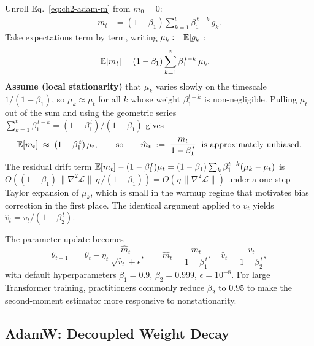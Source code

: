 \begin{derivation}
Unroll Eq.~\eqref{eq:ch2-adam-m} from $m_0 = 0$:
\begin{align*}
m_t &= (1-\beta_1) \sum_{k=1}^{t} \beta_1^{\,t-k}\, g_k.
\end{align*}
Take expectations term by term, writing $\mu_k := \mathbb{E}[g_k]$:
\begin{align*}
\mathbb{E}[m_t]
  &= (1-\beta_1) \sum_{k=1}^{t} \beta_1^{\,t-k}\,\mu_k.
\end{align*}
\textbf{Assume (local stationarity)} that $\mu_k$ varies slowly on the
timescale $1/(1-\beta_1)$, so $\mu_k \approx \mu_t$ for all $k$ whose
weight $\beta_1^{t-k}$ is non-negligible. Pulling $\mu_t$ out of the
sum and using the geometric series
$\sum_{k=1}^{t}\beta_1^{\,t-k} = (1-\beta_1^{\,t})/(1-\beta_1)$ gives
\begin{align*}
\mathbb{E}[m_t] \;\approx\; (1-\beta_1^{\,t})\,\mu_t,
\qquad
\text{so}\qquad
\hat m_t \;:=\; \frac{m_t}{1-\beta_1^{\,t}} \;\text{ is approximately unbiased}.
\end{align*}
The residual drift term $\mathbb{E}[m_t] - (1-\beta_1^{\,t})\mu_t
= (1-\beta_1)\sum_k \beta_1^{t-k}(\mu_k - \mu_t)$ is
$O\!\left((1-\beta_1)\,\|\nabla^{2}\!\mathcal{L}\|\,\eta\,/(1-\beta_1)\right)
= O(\eta\,\|\nabla^{2}\!\mathcal{L}\|)$ under a one-step Taylor
expansion of $\mu_k$, which is small in the warmup regime that motivates
bias correction in the first place. The identical argument applied to
$v_t$ yields $\hat v_t = v_t/(1-\beta_2^{\,t})$.
\end{derivation}

The parameter update becomes
\begin{equation}
\label{eq:ch2-adam-update}
\theta_{t+1} \;=\; \theta_t - \eta_t\,\frac{\hat m_t}{\sqrt{\hat v_t} + \epsilon},
\qquad
\hat m_t = \frac{m_t}{1-\beta_1^{\,t}},
\quad
\hat v_t = \frac{v_t}{1-\beta_2^{\,t}},
\end{equation}
with default hyperparameters $\beta_1 = 0.9$, $\beta_2 = 0.999$,
$\epsilon = 10^{-8}$. For large Transformer training, practitioners
commonly reduce $\beta_2$ to $0.95$ to make the second-moment estimator
more responsive to nonstationarity.

\subsection{AdamW: Decoupled Weight Decay}

